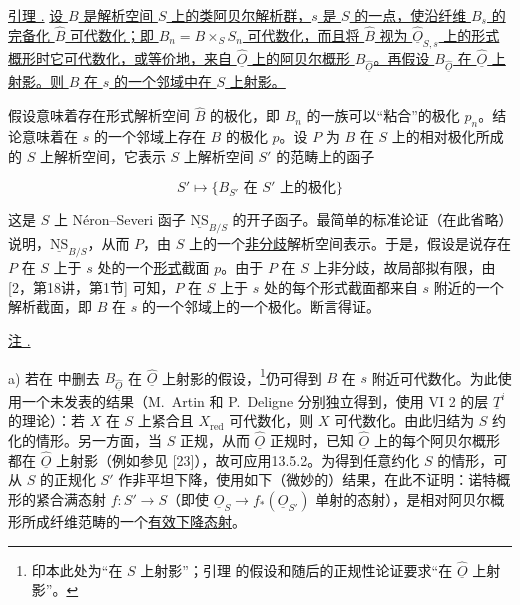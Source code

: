 \medskip
\noindent
\underline{引理 .} \underline{设 $B$ 是解析空间 $S$ 上的类阿贝尔解析群，$s$ 是 $S$ 的一点，使沿纤维 $B_s$ 的完备化 $\hat B$ 可代数化；即 $B_n=B\times_S S_n$ 可代数化，而且将 $\hat B$ 视为 $\hat{\underline O}_{S,s}$ 上的形式概形时它可代数化，或等价地，来自 $\hat{\underline O}$ 上的阿贝尔概形 $B_{\hat{\underline O}}$。再假设 $B_{\hat{\underline O}}$ 在 $\hat{\underline O}$ 上射影。则 $B$ 在 $s$ 的一个邻域中在 $S$ 上射影。}

假设意味着存在形式解析空间 $\hat B$ 的极化，即 $B_n$ 的一族可以“粘合”的极化 $p_n$。结论意味着在 $s$ 的一个邻域上存在 $B$ 的极化 $p$。设 $P$ 为 $B$ 在 $S$ 上的相对极化所成的 $S$ 上解析空间，它表示 $S$ 上解析空间 $S'$ 的范畴上的函子

\begin{equation*}
 S'\longmapsto
 \{\text{$B_{S'}$ 在 $S'$ 上的极化}\}
\end{equation*}

\noindent
这是 $S$ 上 N\'eron--Severi 函子 $\underline{\mathrm{NS}}_{B/S}$ 的开子函子。最简单的标准论证（在此省略）说明，$\underline{\mathrm{NS}}_{B/S}$，从而 $P$，由 $S$ 上的一个\underline{非分歧}解析空间表示。于是，假设是说存在 $P$ 在 $S$ 上于 $s$ 处的一个\underline{形式}截面 $p$。由于 $P$ 在 $S$ 上非分歧，故局部拟有限，由 [2，第18讲，第1节] 可知，$P$ 在 $S$ 上于 $s$ 处的每个形式截面都来自 $s$ 附近的一个解析截面，即 $B$ 在 $s$ 的一个邻域上的一个极化。断言得证。

\medskip
\noindent
\underline{注 .}

\smallskip
\noindent
a) 若在  中删去 $B_{\hat{\underline O}}$ 在 $\hat{\underline O}$ 上射影的假设，\footnote{印本此处为“在 $S$ 上射影”；引理  的假设和随后的正规性论证要求“在 $\hat{\underline O}$ 上射影”。}仍可得到 $B$ 在 $s$ 附近可代数化。为此使用一个未发表的结果（M.~Artin 和 P.~Deligne 分别独立得到，使用 VI 2 的层 $\underline T^i$ 的理论）：若 $X$ 在 $S$ 上紧合且 $X_{\mathrm{red}}$ 可代数化，则 $X$ 可代数化。由此归结为 $S$ 约化的情形。另一方面，当 $S$ 正规，从而 $\hat{\underline O}$ 正规时，已知 $\hat{\underline O}$ 上的每个阿贝尔概形都在 $\hat{\underline O}$ 上射影（例如参见 [23]），故可应用13.5.2。为得到任意约化 $S$ 的情形，可从 $S$ 的正规化 $S'$ 作非平坦下降，使用如下（微妙的）结果，在此不证明：诺特概形的紧合满态射 $f:S'\longrightarrow S$（即使 $\underline O_S\longrightarrow f_*(\underline O_{S'})$ 单射的态射），是相对阿贝尔概形所成纤维范畴的一个\underline{有效下降态射}。

